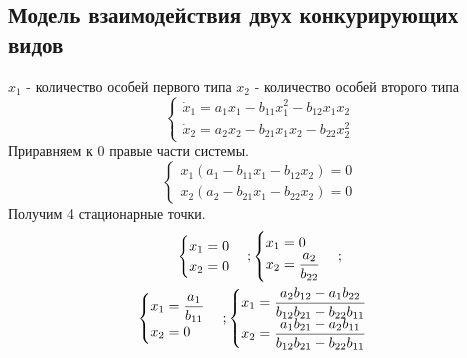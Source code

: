 \subsection{Модель взаимодействия двух конкурирующих видов}
$x_1$ - количество особей первого типа
$x_2$ - количество особей второго типа
\begin{equation}
  \begin{cases}
    \dot{x}_1=a_1x_1-b_{11}x_1^2-b_{12}x_1x_2\\
    \dot{x}_2=a_2x_2-b_{21}x_1x_2-b_{22}x_2^2
  \end{cases}
\end{equation}
Приравняем к 0 правые части системы.
\begin{equation}
  \begin{cases}
    x_1(a_1-b_{11}x_1-b_{12}x_2)=0\\
    x_2(a_2-b_{21}x_1-b_{22}x_2)=0
  \end{cases}
\end{equation}
Получим 4 стационарные точки.
\begin{gather}
  \begin{cases}
    x_1=0\\
    x_2=0
  \end{cases};
  \begin{cases}
    x_1=0\\
    x_2=\dfrac{a_2}{b_{22}}
  \end{cases};\\
  \begin{cases}
    x_1=\dfrac{a_1}{b_{11}}\\
    x_2=0
  \end{cases};
  \begin{cases}
    x_1=\dfrac{a_2b_{12}-a_1b_{22}}{b_{12}b_{21}-b_{22}b_{11}}\\
    x_2=\dfrac{a_1b_{21}-a_2b_{11}}{b_{12}b_{21}-b_{22}b_{11}}
  \end{cases}\notag
\end{gather}
% 
